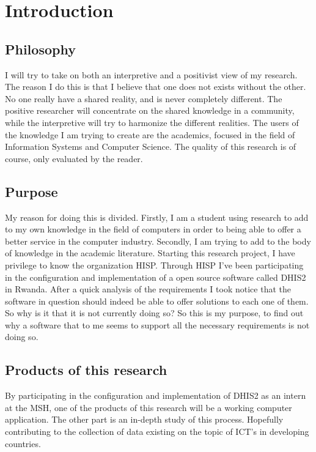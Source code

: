 \chapter{Introduction}


\section{Philosophy}
I will try to take on both an interpretive and a positivist view of my research.
The reason I do this is that I believe that one does not exists without the other.
No one really have a shared reality, and is never completely different.
The positive researcher will concentrate on the shared knowledge in a community, while the interpretive will try to harmonize the different realities. The users of the knowledge I am trying to create are the academics, focused in the field of Information Systems and Computer Science. The quality of this research is of course, only evaluated by the reader.

\section{Purpose}
My reason for doing this is divided. 
Firstly, I am a student using research to add to my own knowledge in the field of computers in order to being able to offer a better service in the computer industry.
Secondly, I am trying to add to the body of knowledge in the academic literature.
Starting this research project, I have privilege to know the organization HISP. 
Through HISP I've been participating in the configuration and implementation of a open source software called DHIS2 in Rwanda. After a quick analysis of the requirements I took notice that the software in question should indeed be able to offer solutions to each one of them. So why is it that it is not currently doing so? 
So this is my purpose, to find out why a software that to me seems to support all the necessary requirements is not doing so.

\section{Products of this research}
By participating in the configuration and implementation of DHIS2 as an intern at the MSH, one of the products of this research will be a working computer application. The other part is an in-depth study of this process. Hopefully contributing to the collection of data existing on the topic of ICT's in developing countries.



